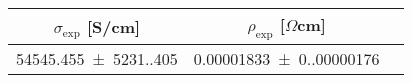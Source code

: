 \begin{tabular}{ccc}
\toprule
$\sigma_{\exp}$ [S/cm] & $\rho_{\exp}$ [$\Omega$cm] \\
\midrule
\num{54545.455(5231.405)} & \num{0.00001833(0.00000176)} \\
\bottomrule
\end{tabular}
